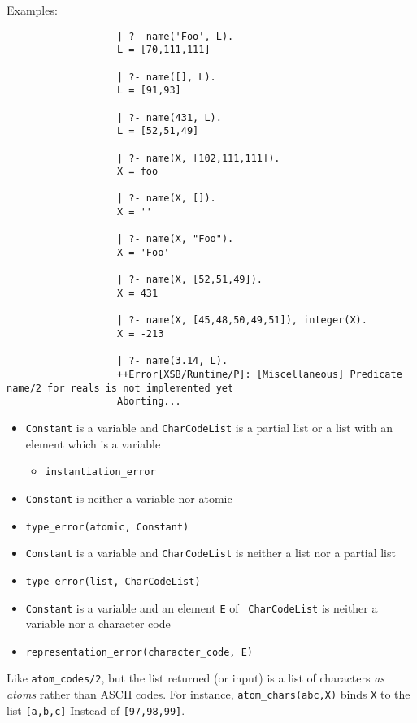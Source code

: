 \begin{description}
    Examples:
    {\footnotesize
     \begin{verbatim}
                   | ?- name('Foo', L).
                   L = [70,111,111]

                   | ?- name([], L).
                   L = [91,93]

                   | ?- name(431, L).
                   L = [52,51,49]

                   | ?- name(X, [102,111,111]).
                   X = foo
 
                   | ?- name(X, []).
                   X = ''

                   | ?- name(X, "Foo").
                   X = 'Foo'

                   | ?- name(X, [52,51,49]).
                   X = 431

                   | ?- name(X, [45,48,50,49,51]), integer(X).
                   X = -213

                   | ?- name(3.14, L).
                   ++Error[XSB/Runtime/P]: [Miscellaneous] Predicate name/2 for reals is not implemented yet
                   Aborting...
     \end{verbatim}}

\begin{itemize}
\item {\tt Constant} is a variable and {\tt CharCodeList} is a partial
  list or a list with an element which is a variable
\begin{itemize}
\item {\tt instantiation\_error}
\end{itemize}
\item {\tt Constant} is neither a variable nor atomic
\bi
\item {\tt type\_error(atomic, Constant)}
\ei
\item {\tt Constant} is a variable and {\tt CharCodeList} is neither a
  list nor a partial list 
\bi
\item {\tt type\_error(list, CharCodeList)}
\ei
\item {\tt Constant} is a variable and an element {\tt E} of {\tt
  CharCodeList} is neither a variable nor a character code 
\bi
\item {\tt representation\_error(character\_code, E)}
\ei
\end{itemize}

    Like \verb|atom_codes/2|, but the list returned (or input) is a list of
    characters \emph{as atoms} rather than ASCII codes. For instance, 
    \verb|atom_chars(abc,X)| binds {\tt X} to the list {\tt [a,b,c]}
    Instead of {\tt [97,98,99]}.


\end{description}
